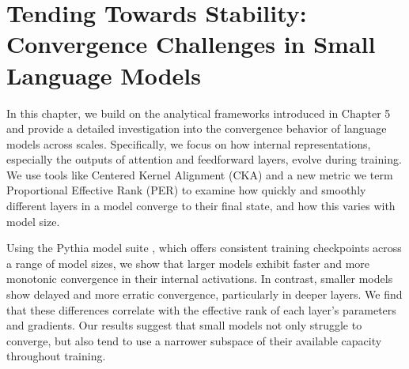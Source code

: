 \chapter{Tending Towards Stability: Convergence Challenges in Small Language Models}
\label{chapter:tending-towards-stability}



In this chapter, we build on the analytical frameworks introduced in Chapter 5 and provide a detailed investigation into the convergence behavior of language models across scales. Specifically, we focus on how internal representations, especially the outputs of attention and feedforward layers, evolve during training. We use tools like Centered Kernel Alignment (CKA) and a new metric we term Proportional Effective Rank (PER) to examine how quickly and smoothly different layers in a model converge to their final state, and how this varies with model size.

Using the Pythia model suite \citep{biderman2023pythia}, which offers consistent training checkpoints across a range of model sizes, we show that larger models exhibit faster and more monotonic convergence in their internal activations. In contrast, smaller models show delayed and more erratic convergence, particularly in deeper layers. We find that these differences correlate with the effective rank of each layer's parameters and gradients. Our results suggest that small models not only struggle to converge, but also tend to use a narrower subspace of their available capacity throughout training.

